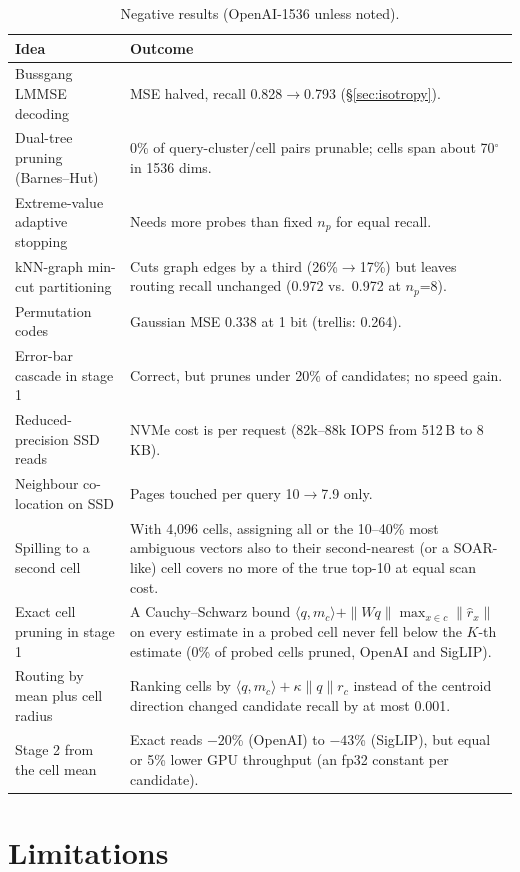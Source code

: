 \documentclass[fleqn,10pt]{wlscirep}
\begin{document}
\begin{table}[!htbp]
\caption{Negative results (OpenAI-1536 unless noted).}
\label{tab:neg}
\small
\begin{tabular}{p{4.5cm}p{11cm}}
\toprule
Idea & Outcome \\
\midrule
Bussgang LMMSE decoding & MSE halved, recall 0.828$\to$0.793 (\S\ref{sec:isotropy}). \\
Dual-tree pruning (Barnes--Hut) & 0\% of query-cluster/cell pairs prunable; cells span about 70$^\circ$ in 1536 dims. \\
Extreme-value adaptive stopping & Needs more probes than fixed $n_p$ for equal recall. \\
kNN-graph min-cut partitioning & Cuts graph edges by a third (26\%$\to$17\%) but leaves routing recall unchanged (0.972 vs.\ 0.972 at $n_p$=8). \\
Permutation codes & Gaussian MSE 0.338 at 1 bit (trellis: 0.264). \\
Error-bar cascade in stage 1 & Correct, but prunes under 20\% of candidates; no speed gain. \\
Reduced-precision SSD reads & NVMe cost is per request (82k--88k IOPS from 512\,B to 8\,KB). \\
Neighbour co-location on SSD & Pages touched per query 10$\to$7.9 only. \\
Spilling to a second cell & With 4{,}096 cells, assigning all or the 10--40\% most ambiguous vectors also to their second-nearest (or a SOAR-like) cell covers no more of the true top-10 at equal scan cost. \\
Exact cell pruning in stage 1 & A Cauchy--Schwarz bound $\langle q,m_c\rangle+\|Wq\|\max_{x\in c}\|\hat r_x\|$ on every estimate in a probed cell never fell below the $K$-th estimate (0\% of probed cells pruned, OpenAI and SigLIP). \\
Routing by mean plus cell radius & Ranking cells by $\langle q,m_c\rangle+\kappa\|q\|r_c$ instead of the centroid direction changed candidate recall by at most 0.001. \\
Stage 2 from the cell mean & Exact reads $-20$\% (OpenAI) to $-43$\% (SigLIP), but equal or 5\% lower GPU throughput (an fp32 constant per candidate). \\
\bottomrule
\end{tabular}
\end{table}

\section{Limitations}\label{sec:limits}
\end{document}
